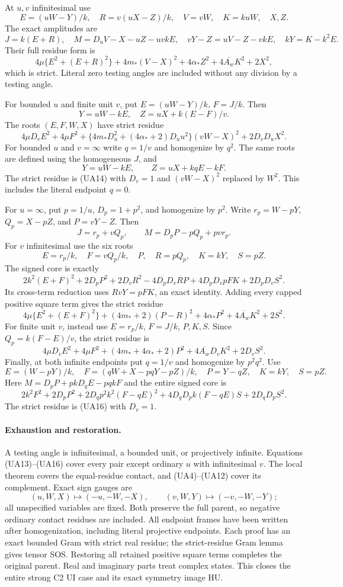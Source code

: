 At $u,v$ infinitesimal use
\[
 E=(uW-Y)/k,\quad R=v(uX-Z)/k,\quad V=vW,\quad K=kuW,
 \quad X,Z.
\]
The exact amplitudes are
\[
 J=k(E+R),\quad M=D_uV-X-uZ-uvkE,\quad
 vY-Z=uV-Z-vkE,\quad kY=K-k^2E.
\]
Their full residue form is
\[
 4\mu\{E^2+(E+R)^2\}+4m_*(V-X)^2+4\alpha_*Z^2
       +4\overline{A_w}K^2+2X^2,                    \tag{UA13}
\]
which is strict. Literal zero testing angles are included without
any division by a testing angle.

For bounded $u$ and finite unit $v$, put
$E=(uW-Y)/k$, $F=J/k$. Then
\[
 Y=uW-kE,\quad Z=uX+k(E-F)/v.
\]
The roots $(E,F,W,X)$ have strict residue
\[
 4\mu D_vE^2+4\mu F^2+
 \{4m_*D_u^2+(4\alpha_*+2)D_uu^2\}(vW-X)^2
 +2D_vD_uX^2.                                      \tag{UA14}
\]
For bounded $u$ and $v=\infty$ write $q=1/v$ and homogenize by $q^2$.
The same roots are defined using the homogeneous $J$, and
\[
 Y=uW-kE,\qquad Z=uX+kqE-kF.
\]
The strict residue is (UA14) with $D_v=1$ and $(vW-X)^2$ replaced
by $W^2$. This includes the literal endpoint $q=0$.

For $u=\infty$, put $p=1/u$, $D_p=1+p^2$, and homogenize by $p^2$.
Write $r_p=W-pY$, $Q_p=X-pZ$, and $P=vY-Z$. Then
\[
 J=r_p+vQ_p,\qquad M=D_pP-pQ_p+pv r_p.
\]
For $v$ infinitesimal use the six roots
\[
 E=r_p/k,\quad F=vQ_p/k,\quad P,\quad R=pQ_p,
 \quad K=kY,\quad S=pZ.
\]
The signed core is exactly
\[
 2k^2(E+F)^2+2D_pP^2+2D_vR^2-4D_pD_vRP
    +4D_pD_vpFK+2D_pD_vS^2.
\]
Its cross-term reduction uses $RvY=pFK$, an exact identity.
Adding every capped positive square term gives the strict residue
\[
 4\mu\{E^2+(E+F)^2\}+(4m_*+2)(P-R)^2
 +4\alpha_*P^2+4\overline{A_w}K^2+2S^2.             \tag{UA15}
\]
For finite unit $v$, instead use $E=r_p/k$, $F=J/k$, $P,K,S$.
Since $Q_p=k(F-E)/v$, the strict residue is
\[
 4\mu D_vE^2+4\mu F^2+(4m_*+4\alpha_*+2)P^2
 +4\overline{A_w}D_vK^2+2D_vS^2.                   \tag{UA16}
\]
Finally, at both infinite endpoints put $q=1/v$ and homogenize by
$p^2q^2$. Use
\[
 E=(W-pY)/k,\quad F=(qW+X-pqY-pZ)/k,\quad
 P=Y-qZ,\quad K=kY,\quad S=pZ.
\]
Here $M=D_pP+pkD_qE-pqkF$ and the entire signed core is
\[
 2k^2F^2+2D_pP^2+2D_qp^2k^2(F-qE)^2
 +4D_qD_pk(F-qE)S+2D_qD_pS^2.
\]
The strict residue is (UA16) with $D_v=1$.

\paragraph{Exhaustion and restoration.}
A testing angle is infinitesimal, a bounded unit, or projectively
infinite. Equations (UA13)--(UA16) cover every pair except ordinary
$u$ with infinitesimal $v$. The local theorem covers the equal-residue
contact, and (UA4)--(UA12) cover its complement. Exact sign gauges are
\[
 (u,W,X)\mapsto(-u,-W,-X),\qquad
 (v,W,Y)\mapsto(-v,-W,-Y);
\]
all unspecified variables are fixed. Both preserve the full parent,
so negative ordinary contact residues are included. All endpoint
frames have been written after homogenization, including literal
projective endpoints. Each proof has an exact bounded Gram with
strict real residue; the strict-residue Gram lemma gives tensor SOS.
Restoring all retained positive square terms completes the original parent.
Real and imaginary parts treat complex states. This closes the
entire strong C2 UI case and its exact symmetry image HU.

